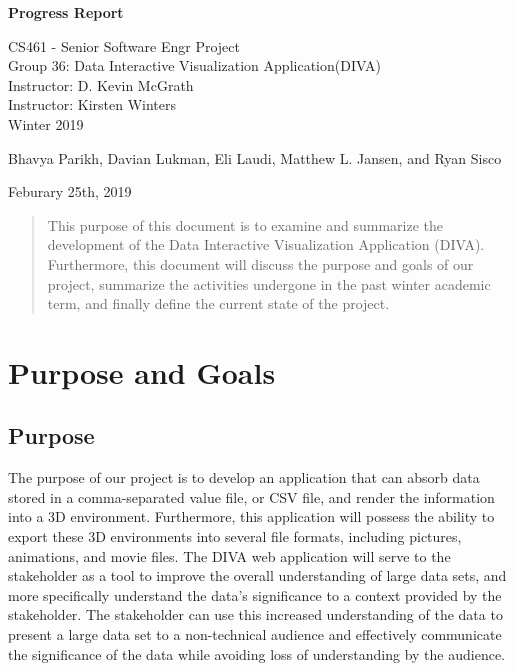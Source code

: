\documentclass[journal,10pt,onecolumn,compsoc]{IEEEtran} \usepackage[margin=1.0in]{geometry} \usepackage{pdfpages}
\begin{document}
\begin{center}
  
  \textbf{}

  \vspace{4cm}
  \Huge{}
  \textbf {Progress Report}
  \vspace{1.5cm}

 
  \LARGE
  CS461 - Senior Software Engr Project\\
  \vspace{0.25cm}
  Group 36: Data Interactive Visualization Application(DIVA)\\
  Instructor: D. Kevin McGrath \\
  Instructor: Kirsten Winters \\
  \vspace{0.25cm}
  Winter 2019 \\
  \vspace{1.5cm}
  
  \large{Bhavya Parikh, Davian Lukman, Eli Laudi, Matthew L. Jansen, and Ryan Sisco}\\
  \date{Feburary 25th, 2019}
  \vfill
  Feburary 25th, 2019\\
  \vspace{1cm}
  \vspace*{\fill}
   \begin{abstract}
       \noindent This purpose of this document is to examine and summarize the development of the Data Interactive Visualization Application (DIVA). Furthermore, this document will discuss the purpose and goals of our project, summarize the activities undergone in the past winter academic term, and finally define the current state of the project. 
   \end{abstract}
    \normalsize 
  \end{center}
\newpage
{\hypersetup{linkcolor=black}
\tableofcontents
}
\newpage

\section{Purpose and Goals}
\subsection{Purpose}
The purpose of our project is to develop an application that can absorb data stored in a comma-separated value file, or CSV file, and render the information into a 3D environment. Furthermore, this application will possess the ability to export these 3D environments into several file formats, including pictures, animations, and movie files. The DIVA web application will serve to the stakeholder as a tool to improve the overall understanding of large data sets, and more specifically understand the data's significance to a context provided by the stakeholder. The stakeholder can use this increased understanding of the data to present a large data set to a non-technical audience and effectively communicate the significance of the data while avoiding loss of understanding by the audience. 
\end{document}
